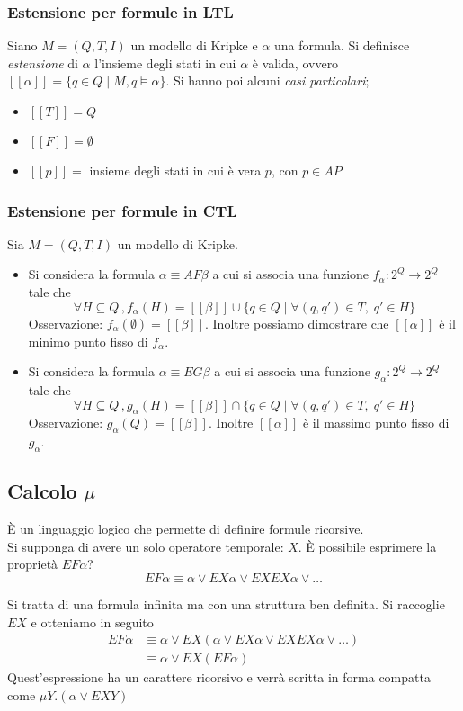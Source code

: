 \subsubsection{Estensione per formule in LTL}
Siano $M = (Q, T, I)$ un modello di Kripke e $\alpha$ una formula.
Si definisce \textit{estensione} di $\alpha$ l’insieme degli stati in cui $\alpha$ è valida, ovvero $[[\alpha]] = \{q \in Q \; | \; M, q \models \alpha\}$.
Si hanno poi alcuni \textit{casi particolari};
\begin{itemize}
    \item $[[T]] = Q$
    \item $[[F]]=\emptyset$
    \item $[[p]] = $ insieme degli stati in cui è vera $p$, con $p \in AP$
\end{itemize}

\subsubsection{Estensione per formule in CTL}
Sia $M = (Q, T, I)$ un modello di Kripke.
\begin{itemize}
    \item Si considera la formula $\alpha \equiv AF\beta$ a cui si associa una funzione $f_{\alpha}: 2^Q \to 2^Q$ tale che 
    \[\forall H \subseteq Q \, ,f_{\alpha}(H) = [[\beta]] \cup \{q \in Q \; | \; \forall (q, q') \in T, \; q' \in H\}\]
    Osservazione: $f_{\alpha}(\emptyset) = [[\beta]]$. Inoltre possiamo dimostrare che $[[\alpha]]$ è il minimo punto fisso di $f_\alpha$.
  \item Si considera la formula $\alpha \equiv EG\beta$ a cui si associa una funzione $g_{\alpha}: 2^Q \to 2^Q$ tale che 
  \[\forall H \subseteq Q \, ,g_{\alpha}(H) = [[\beta]] \cap \{q \in Q \; | \; \forall (q, q') \in T, \; q' \in H\}\]
  Osservazione: $g_{\alpha}(Q) = [[\beta]]$. Inoltre $[[\alpha]]$ è il massimo punto fisso di $g_\alpha$.
\end{itemize}

\subsection{Calcolo $\mu$}
È un linguaggio logico che permette di definire formule ricorsive. \\
Si supponga di avere un solo operatore temporale: $X$. È possibile esprimere la proprietà $EF \alpha$?
\[EF \alpha \equiv \alpha \lor EX\alpha \lor EXEX \alpha \lor \dots\]

Si tratta di una formula infinita ma con una struttura ben definita.
Si raccoglie $EX$ e otteniamo in seguito 
\begin{equation*}
    \begin{split}
        EF \alpha   &\equiv \alpha \lor EX(\alpha \lor EX \alpha \lor EXEX \alpha \lor \dots)\\
                    & \equiv \alpha \lor EX(EF \alpha)
    \end{split}
\end{equation*}
Quest’espressione ha un carattere ricorsivo e verrà scritta in forma compatta come $\mu Y.(\alpha \lor EXY)$\\

